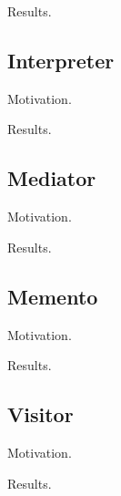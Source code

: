   Results. 

  \begin{example}
    
  \end{example}

\subsection{Interpreter}

  Motivation. 

  \begin{definition}[]
    
  \end{definition}

  Results. 

  \begin{example}
    
  \end{example}

\subsection{Mediator}

  Motivation. 

  \begin{definition}[]
    
  \end{definition}

  Results. 

  \begin{example}
    
  \end{example}

\subsection{Memento}

  Motivation. 

  \begin{definition}[]
    
  \end{definition}

  Results. 

  \begin{example}
    
  \end{example}

\subsection{Visitor}

  Motivation. 

  \begin{definition}[]
    
  \end{definition}

  Results. 

  \begin{example}
    
  \end{example}


